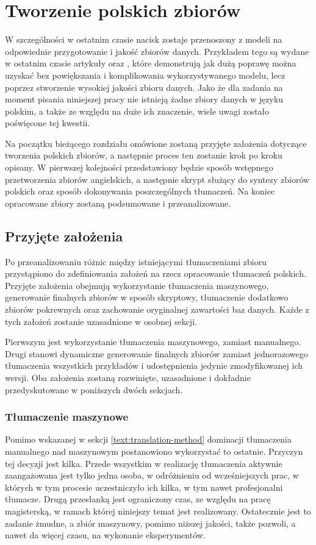 \chapter{Tworzenie polskich zbiorów}
W szczególności w ostatnim czasie nacisk zostaje przenoszony z modeli na odpowiednie przygotowanie i jakość zbiorów danych. Przykładem tego są wydane w ostatnim czasie artykuły   oraz  , które demonstrują jak dużą poprawę można uzyskać bez powiększania i komplikowania wykorzystywanego modelu, lecz poprzez stworzenie wysokiej jakości zbioru danych. Jako że dla zadania  na moment pisania niniejszej pracy nie istnieją żadne zbiory danych w języku polskim, a także ze względu na duże ich znaczenie, wiele uwagi zostało poświęcone tej kwestii. 

Na początku bieżącego rozdziału omówione zostaną przyjęte założenia dotyczące tworzenia polskich zbiorów, a następnie proces ten zostanie krok po kroku opisany. W pierwszej kolejności przedstawiony będzie sposób wstępnego przetworzenia zbiorów angielskich, a następnie skrypt służący do syntezy zbiorów polskich oraz sposób dokonywania poszczególnych tłumaczeń. Na koniec opracowane zbiory zostaną podsumowane i przeanalizowane.

\section{Przyjęte założenia}
Po przeanalizowaniu różnic między istniejącymi tłumaczeniami zbioru  przystąpiono do zdefiniowania założeń na rzecz opracowanie tłumaczeń polskich. Przyjęte założenia obejmują wykorzystanie tłumaczenia maszynowego, generowanie finalnych zbiorów w sposób skryptowy, tłumaczenie dodatkowo zbiorów pokrewnych oraz zachowanie oryginalnej zawartości baz danych. Każde z tych założeń zostanie uzasadnione w osobnej sekcji.

 
 Pierwszym jest wykorzystanie tłumaczenia maszynowego, zamiast manualnego. Drugi stanowi dynamiczne generowanie finalnych zbiorów zamiast jednorazowego tłumaczenia wszystkich przykładów i udostępnienia jedynie zmodyfikowanej ich wersji. Oba założenia zostaną rozwinięte, uzasadnione i dokładnie przedyskutowane w poniższych dwóch sekcjach.

\subsection{Tłumaczenie maszynowe}
Pomimo wskazanej w sekcji \ref{text:translation-method} dominacji tłumaczenia manualnego nad maszynowym postanowiono wykorzystać to ostatnie. Przyczyn tej decyzji jest kilka. Przede wszystkim w realizację tłumaczenia aktywnie zaangażowana jest tylko jedna osoba, w odróżnieniu od wcześniejszych prac, w których w tym procesie uczestniczyło ich kilka, w tym nawet profesjonalni tłumacze. Drugą przesłanką jest ograniczony czas, ze względu na pracę magisterską, w ramach której niniejszy temat jest realizowany. Ostatecznie jest to zadanie żmudne, a zbiór maszynowy, pomimo niższej jakości, także pozwoli, a nawet da więcej czasu, na wykonanie eksperymentów.

